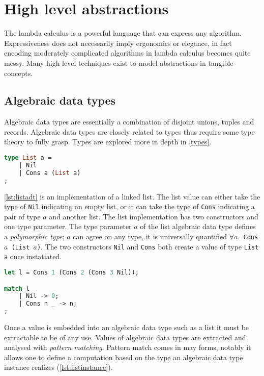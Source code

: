 \documentclass[11pt,oneside,a4paper]{report}
\begin{document}
\section{High level abstractions}\label{sec:highlevel}
The lambda calculus is a powerful language that can express any algorithm.
Expressiveness does not necessarily imply ergonomics or elegance, in fact encoding moderately complicated algorithms in lambda calculus becomes quite messy.
Many high level techniques exist to model abstractions in tangible concepts.

\subsection{Algebraic data types}
\label{sec:adt}
Algebraic data types are essentially a combination of disjoint unions, tuples and records.
Algebraic data types are closely related to types thus require some type theory to fully grasp.
Types are explored more in depth in \autoref{types}.
\begin{lstlisting}[language=ML,caption={List algebraic data type},label={lst:listadt}]
type List a = 
    | Nil
    | Cons a (List a)
;
\end{lstlisting}
\autoref{lst:listadt} is an implementation of a linked list. 
The list value can either take the type of \texttt{Nil} indicating an empty list, or it can take the type of \texttt{Cons} indicating a pair of type $a$ and another list.
The list implementation has two constructors and one type parameter.
The type parameter $a$ of the list algebraic data type defines a \textit{polymorphic type}; $a$ can agree on any type, it is universally quantified \texttt{$\forall a. $ Cons $a$ (List $a$)}.
The two constructors \texttt{Nil} and \texttt{Cons} both create a value of type \texttt{List a} once instatiated.
\begin{lstlisting}[language=ML,caption={List instance and match},label={lst:listinstance}]
let l = Cons 1 (Cons 2 (Cons 3 Nil));

match l 
    | Nil -> 0;
    | Cons n _ -> n;
;
\end{lstlisting}
Once a value is embedded into an algebraic data type such as a list it must be extractable to be of any use.
Values of algebraic data types are extracted and analysed with \textit{pattern matching}.
Pattern match comes in may forms, notably it allows one to define a computation based on the type an algebraic data type instance realizes (\autoref{lst:listinstance}).
\end{document}
